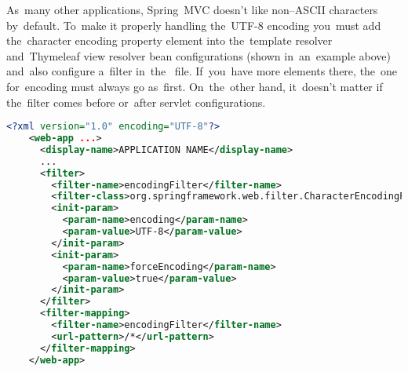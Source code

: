 As~many other applications, Spring~MVC doesn't like non--ASCII characters by~default.
To~make it properly handling the~UTF-8 encoding you~must add the~character encoding property element into the~template resolver and~Thymeleaf view resolver bean configurations (shown in~an~example above) and~also configure a~filter in~the~ file.
If~you~have more  elements there, the~one for~encoding must always go as~first.
On~the~other hand, it~doesn't matter if the~filter comes before or~after servlet configurations.

\begin{lstlisting}[language=XML, title=Example of a~\textit{web.xml} file with encoding filter configuration]
    <?xml version="1.0" encoding="UTF-8"?>
    <web-app ...>
      <display-name>APPLICATION NAME</display-name>
      ...
      <filter>
        <filter-name>encodingFilter</filter-name>
        <filter-class>org.springframework.web.filter.CharacterEncodingFilter </filter-class>
        <init-param>
          <param-name>encoding</param-name>
          <param-value>UTF-8</param-value>
        </init-param>
        <init-param>
          <param-name>forceEncoding</param-name>
          <param-value>true</param-value>
        </init-param>
      </filter>
      <filter-mapping>
        <filter-name>encodingFilter</filter-name>
        <url-pattern>/*</url-pattern>
      </filter-mapping>
    </web-app>
\end{lstlisting}

\todo

\todo
